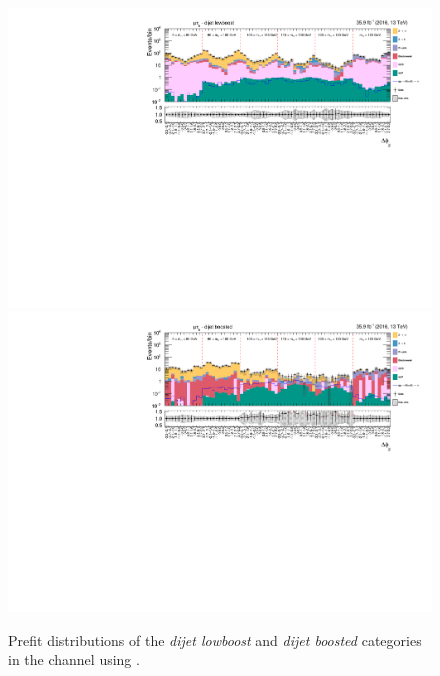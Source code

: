     \begin{figure}[h!]
        \centering        
        \includegraphics[width=\textwidth]{Figures/statana/Postfit_JEC_jdphi/prefit_htt_mt_3_13TeV.pdf}\\
        \includegraphics[width=\textwidth]{Figures/statana/Postfit_JEC_jdphi/prefit_htt_mt_4_13TeV.pdf}
    \caption{Prefit distributions of the \textit{dijet lowboost} and \textit{dijet boosted} categories in the \mutau{} channel  using \jdphi{}.}
\end{figure}
\clearpage
